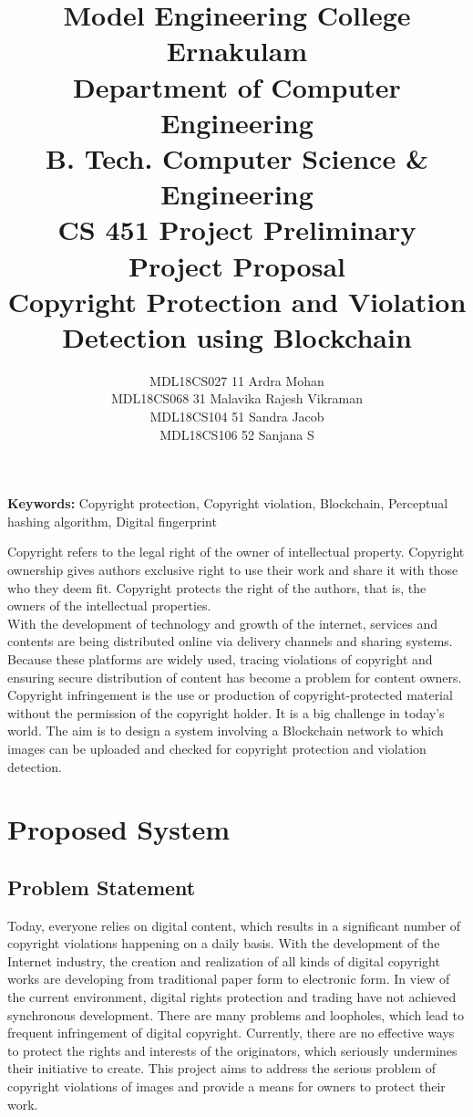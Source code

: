 \documentclass[10pt]{article}
\title{Model Engineering College Ernakulam
\\Department of Computer Engineering
\\B. Tech. Computer Science \& Engineering 
\\CS 451 Project Preliminary
\\ Project Proposal
\\Copyright Protection and Violation Detection using Blockchain
}
\author{
MDL18CS027 11 Ardra Mohan
\\MDL18CS068 31 Malavika Rajesh Vikraman
\\MDL18CS104 51 Sandra Jacob
\\MDL18CS106 52 Sanjana S}
\begin{document}
\maketitle
{\bf Keywords:} Copyright protection, Copyright violation, Blockchain, Perceptual hashing algorithm, Digital fingerprint

\abstract{}
Copyright refers to the legal right of the owner of intellectual property. Copyright ownership gives authors exclusive right to use their work and share it with those who they deem fit. Copyright protects the right of the authors, that is, the owners of the intellectual properties. \\
\indent With the development of technology and growth of the internet, services and contents are being distributed online via delivery channels and sharing systems. Because these platforms are widely used, tracing violations of copyright and ensuring secure distribution of content has become a problem for content owners. Copyright infringement is the use or production of copyright-protected material without the permission of the copyright holder. It is a big challenge in today’s world. The aim is to design a system involving a Blockchain network to which images can be uploaded and checked for copyright protection and violation detection.
\section{Proposed System}
\subsection{Problem Statement}
Today, everyone relies on digital content, which results in a significant number of copyright violations happening on a daily basis. With the development of the Internet industry, the creation and realization of all kinds of digital copyright works are developing from traditional paper form to electronic form. In view of the current environment, digital rights protection and trading have not achieved synchronous development. There are many problems and loopholes, which lead to frequent infringement of digital copyright. Currently, there are no effective ways to protect the rights and interests of the originators, which seriously undermines their initiative to create. This project aims to address the serious problem of copyright violations of images and provide a means for owners to protect their work. 
\end{document}
